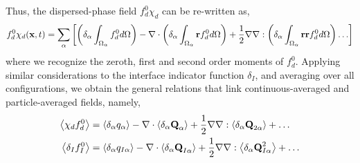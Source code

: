 Thus, the dispersed-phase field $f_d^0\chi_d$ can be re-written as, 
\begin{equation*}
    f^0_d \chi_d(\textbf{x},t)
    = \sum_\alpha \left[
          \left(\delta_\alpha\int_{\Omega_{\alpha}} f^0_d d\Omega\right)
        - \mathbf{\nabla}\cdot\left(\delta_\alpha\int_{\Omega_{\alpha}} \textbf{r} f^0_d d\Omega\right)
        + \frac{1}{2}\mathbf{\nabla}\mathbf{\nabla} :\left(\delta_\alpha\int_{\Omega_{\alpha}} \textbf{rr} f^0_d d\Omega\right)
        \ldots
    \right]
\end{equation*}
where we recognize the zeroth, first and second order moments of $f_d^0$. 
Applying similar considerations to the interface indicator function $\delta_I$, and averaging over all configurations, we obtain the general relations that link continuous-averaged and particle-averaged fields, namely, 
\begin{align}
    \left<\chi_df_d^0\right> 
    &=  \left<\delta_\alpha q_\alpha\right>
        - \mathbf{\nabla}\cdot  
        \left<\delta_\alpha \textbf{Q}_\alpha\right>        
        + \frac{1}{2} \mathbf{\nabla}\mathbf{\nabla} : \left<\delta_\alpha \textbf{Q}_{2\alpha}\right>
        + \ldots  
        \nonumber\\
    \left<\delta_I f_I^0\right> 
    &=  \left<\delta_\alpha q_{I\alpha}\right>        
        - \mathbf{\nabla}\cdot \left<\delta_\alpha \textbf{Q}_{I\alpha}\right>
        + \frac{1}{2} \mathbf{\nabla}\mathbf{\nabla} : \left<\delta_\alpha \textbf{Q}_{I\alpha}^{2}\right>
        + \ldots  
    \label{eq:f_exp}
\end{align}

